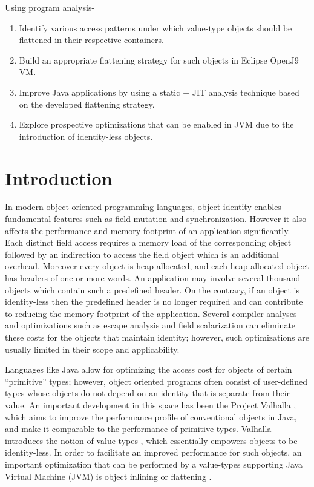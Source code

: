 \documentclass[12 pt, a4paper]{article}
\begin{document}
Using program analysis-
\begin{enumerate}
\item Identify various access patterns under which value-type objects should be flattened in their respective containers.
\item Build an appropriate flattening strategy for such objects in Eclipse OpenJ9 VM.
\item Improve Java applications by using a static + JIT analysis technique based on the developed flattening strategy.
\item Explore prospective optimizations that can be enabled in JVM due to the introduction of identity-less objects.

\end{enumerate} 

\section{Introduction}
In modern object-oriented programming languages, object identity
enables fundamental features such as field mutation and synchronization.
However it also affects the performance and memory footprint of an application significantly. 
Each distinct field access requires a memory load of the corresponding object followed by an 
indirection to access the field object which is an additional overhead.
Moreover every object is heap-allocated, and each heap allocated object has headers of one or 
more words. An application may involve several 
thousand objects which contain such a predefined header. On the contrary, if an object is 
identity-less then the predefined header is no longer required and can contribute to reducing the 
memory footprint of the application.  Several compiler
analyses and optimizations such as escape analysis and field scalarization can eliminate 
these costs for the objects that maintain identity; however,
such optimizations are usually limited in their scope and applicability.


	Languages like Java allow for optimizing the access cost for
objects of certain “primitive” types; however, object oriented programs often
consist of user-defined types whose objects do not depend
on an identity that is separate from their value. An important
development in this space has been the Project Valhalla \citep{PV}, which
aims to improve the performance profile of conventional objects in
Java, and make it comparable to the performance of primitive types.
Valhalla introduces the notion of value-types \citep{JEPD}, which essentially
empowers objects to be identity-less. In order to facilitate an improved 
performance for such objects, an important optimization
that can be performed by a value-types supporting Java Virtual
Machine (JVM) is object inlining or flattening \citep{ObjectInlining}.
\end{document}
